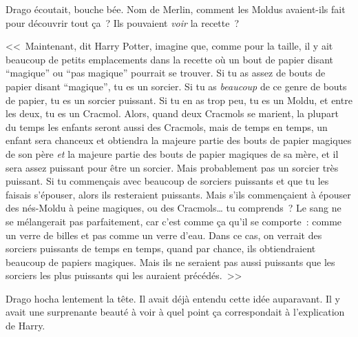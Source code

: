 Drago écoutait, bouche bée. Nom de Merlin, comment les Moldus avaient-ils fait pour découvrir tout ça~? Ils pouvaient \emph{voir} la recette~?

<<~Maintenant, dit Harry Potter, imagine que, comme pour la taille, il y ait beaucoup de petits emplacements dans la recette où un bout de papier disant “magique” ou “pas magique” pourrait se trouver. Si tu as assez de bouts de papier disant “magique”, tu es un sorcier. Si tu as \emph{beaucoup} de ce genre de bouts de papier, tu es un sorcier puissant. Si tu en as trop peu, tu es un Moldu, et entre les deux, tu es un Cracmol. Alors, quand deux Cracmols se marient, la plupart du temps les enfants seront aussi des Cracmols, mais de temps en temps, un enfant sera chanceux et obtiendra la majeure partie des bouts de papier magiques de son père \emph{et} la majeure partie des bouts de papier magiques de sa mère, et il sera assez puissant pour être un sorcier. Mais probablement pas un sorcier très puissant. Si tu commençais avec beaucoup de sorciers puissants et que tu les faisais s'épouser, alors ils resteraient puissants. Mais s'ils commençaient à épouser des nés-Moldu à peine magiques, ou des Cracmols… tu comprends~? Le sang ne se mélangerait pas parfaitement, car c'est comme ça qu'il se comporte~: comme un verre de billes et pas comme un verre d'eau. Dans ce cas, on verrait des sorciers puissants de temps en temps, quand par chance, ils obtiendraient beaucoup de papiers magiques. Mais ils ne seraient pas aussi puissants que les sorciers les plus puissants qui les auraient précédés.~>>

Drago hocha lentement la tête. Il avait déjà entendu cette idée auparavant. Il y avait une surprenante beauté à voir à quel point ça correspondait à l'explication de Harry.


